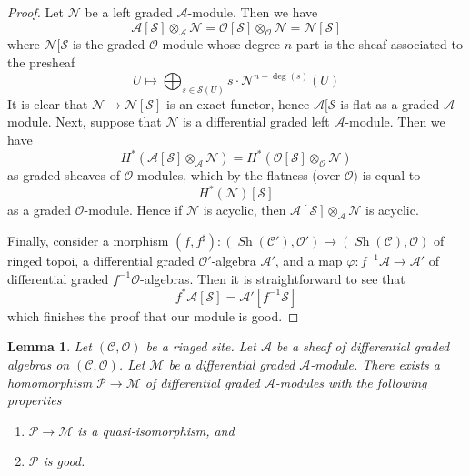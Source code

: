 \documentclass{stacks-project}
\theoremstyle{plain}
\newtheorem{lemma}[subsection]{Lemma}
\theoremstyle{definition}
\theoremstyle{remark}
\numberwithin{equation}{subsection}
\def\Sh{\mathop{\mathit{Sh}}\nolimits}
\begin{document}
\begin{proof}
Let $\mathcal{N}$ be a left graded $\mathcal{A}$-module.
Then we have
$$
\mathcal{A}[\mathcal{S}] \otimes_\mathcal{A} \mathcal{N} =
\mathcal{O}[\mathcal{S}] \otimes_\mathcal{O} \mathcal{N} =
\mathcal{N}[\mathcal{S}]
$$
where $\mathcal{N}[\mathcal{S}$ is the
graded $\mathcal{O}$-module whose degree $n$ part
is the sheaf associated to the presheaf
$$
U \longmapsto
\bigoplus\nolimits_{s \in \mathcal{S}(U)} s \cdot \mathcal{N}^{n - \deg(s)}(U)
$$
It is clear that $\mathcal{N} \to \mathcal{N}[\mathcal{S}]$
is an exact functor, hence $\mathcal{A}[\mathcal{S}$ is flat
as a graded $\mathcal{A}$-module. Next, suppose that $\mathcal{N}$
is a differential graded left $\mathcal{A}$-module. Then we have
$$
H^*(\mathcal{A}[\mathcal{S}] \otimes_\mathcal{A} \mathcal{N}) =
H^*(\mathcal{O}[\mathcal{S}] \otimes_\mathcal{O} \mathcal{N})
$$
as graded sheaves of $\mathcal{O}$-modules, which by the flatness
(over $\mathcal{O})$ is equal to
$$
H^*(\mathcal{N})[\mathcal{S}]
$$
as a graded $\mathcal{O}$-module. Hence if $\mathcal{N}$ is acyclic,
then $\mathcal{A}[\mathcal{S}] \otimes_\mathcal{A} \mathcal{N}$
is acyclic.

\medskip\noindent
Finally, consider a morphism
$(f, f^\sharp) : (\Sh(\mathcal{C}'), \mathcal{O}')
\to (\Sh(\mathcal{C}), \mathcal{O})$
of ringed topoi, a differential graded $\mathcal{O}'$-algebra
$\mathcal{A}'$, and a map $\varphi : f^{-1}\mathcal{A} \to \mathcal{A}'$
of differential graded $f^{-1}\mathcal{O}$-algebras.
Then it is straightforward to see that
$$
f^*\mathcal{A}[\mathcal{S}] = \mathcal{A}'[f^{-1}\mathcal{S}]
$$
which finishes the proof that our module is good.
\end{proof}

\begin{lemma}
\label{lemma-resolve}
Let $(\mathcal{C}, \mathcal{O})$ be a ringed site.
Let $\mathcal{A}$ be a sheaf of differential graded algebras
on $(\mathcal{C}, \mathcal{O})$. Let $\mathcal{M}$
be a differential graded $\mathcal{A}$-module. There exists a homomorphism
$\mathcal{P} \to \mathcal{M}$ of differential graded $\mathcal{A}$-modules
with the following properties
\begin{enumerate}
\item $\mathcal{P} \to \mathcal{M}$ is a quasi-isomorphism, and
\item $\mathcal{P}$ is good.
\end{enumerate}
\end{lemma}
\end{document}
